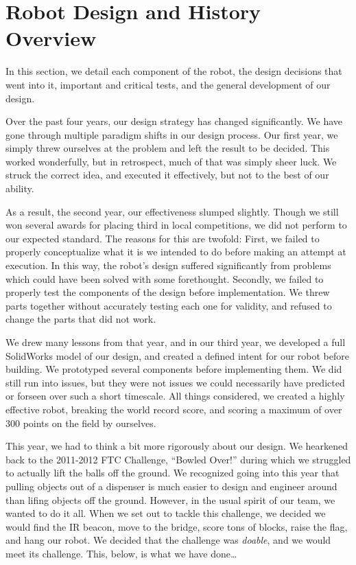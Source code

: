 \section{Robot Design and History Overview}
In this section, we detail each component of the robot, the design decisions that went into it, important and critical tests, and the general development of our design.

Over the past four years, our design strategy has changed significantly. We have gone through multiple paradigm shifts in our design process. Our first year, we simply threw ourselves at the problem and left the result to be decided. This worked wonderfully, but in retrospect, much of that was simply sheer luck. We struck the correct idea, and executed it effectively, but not to the best of our ability. 

As a result, the second year, our effectiveness slumped slightly. Though we still won several awards for placing third in local competitions, we did not perform to our expected standard. The reasons for this are twofold: First, we failed to properly conceptualize what it is we intended to do before making an attempt at execution. In this way, the robot's design suffered significantly from problems which could have been solved with some forethought. Secondly, we failed to properly test the components of the design before implementation. We threw parts together without accurately testing each one for validity, and refused to change the parts that did not work.

We drew many lessons from that year, and in our third year, we developed a full SolidWorks model of our design, and created a defined intent for our robot before building. We prototyped several components before implementing them. We did still run into issues, but they were not issues we could necessarily have predicted or forseen over such a short timescale. All things considered, we created a highly effective robot, breaking the world record score, and scoring a maximum of over 300 points on the field by ourselves.

This year, we had to think a bit more rigorously about our design. We hearkened back to the 2011-2012 FTC Challenge, ``Bowled Over!'' during which we struggled to actually lift the balls off the ground. We recognized going into this year that pulling objects out of a dispenser is much easier to design and engineer around than lifing objects off the ground. However, in the usual spirit of our team, we wanted to do it all. When we set out to tackle this challenge, we decided we would find the IR beacon, move to the bridge, score tons of blocks, raise the flag, and hang our robot. We decided that the challenge was \textit{doable}, and we would meet its challenge. This, below, is what we have done\ldots

